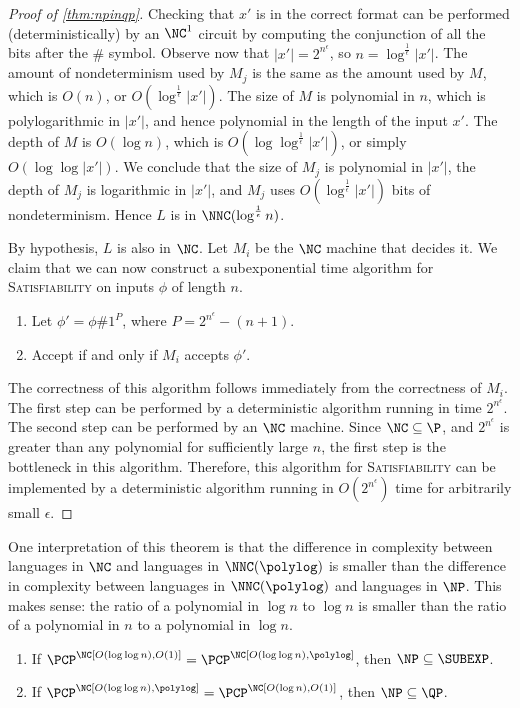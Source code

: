 \documentclass{article}
\newcommand{\loglog}{\log\log}
\begin{document}
\begin{proof}[Proof of \autoref{thm:npinqp}]
  Checking that $x'$ is in the correct format can be performed (deterministically) by an $\NC^1$ circuit by computing the conjunction of all the bits after the $\#$ symbol.
  Observe now that $|x'| = 2^{n^\epsilon}$, so $n = \log^\frac{1}{\epsilon}{|x'|}$.
  The amount of nondeterminism used by $M_j$ is the same as the amount used by $M$, which is $O(n)$, or $O(\log^\frac{1}{\epsilon} |x'|)$.
  The size of $M$ is polynomial in $n$, which is polylogarithmic in $|x'|$, and hence polynomial in the length of the input $x'$.
  The depth of $M$ is $O(\log n)$, which is $O(\log \log^\frac{1}{\epsilon} |x'|)$, or simply $O(\log \log |x'|)$.
  We conclude that the size of $M_j$ is polynomial in $|x'|$, the depth of $M_j$ is logarithmic in $|x'|$, and $M_j$ uses $O(\log^\frac{1}{\epsilon} |x'|)$ bits of nondeterminism.
  Hence $L$ is in $\NNC(\log^\frac{1}{\epsilon} n)$.

  By hypothesis, $L$ is also in $\NC$.
  Let $M_i$ be the $\NC$ machine that decides it.
  We claim that we can now construct a subexponential time algorithm for \textsc{Satisfiability} on inputs $\phi$ of length $n$.
  \begin{enumerate}
  \item Let $\phi' = \phi \# 1^P$, where $P = 2^{n^\epsilon} - (n + 1)$.
  \item Accept if and only if $M_i$ accepts $\phi'$.
  \end{enumerate}
  The correctness of this algorithm follows immediately from the correctness of $M_i$.
  The first step can be performed by a deterministic algorithm running in time $2^{n^\epsilon}$.
  The second step can be performed by an $\NC$ machine.
  Since $\NC \subseteq \P$, and $2^{n^\epsilon}$ is greater than any polynomial for sufficiently large $n$, the first step is the bottleneck in this algorithm.
  Therefore, this algorithm for \textsc{Satisfiability} can be implemented by a deterministic algorithm running in $O(2^{n^\epsilon})$ time for arbitrarily small $\epsilon$.
\end{proof}

One interpretation of this theorem is that the difference in complexity between languages in $\NC$ and languages in $\NNC(\polylog)$ is smaller than the difference in complexity between languages in $\NNC(\polylog)$ and languages in $\NP$.
This makes sense: the ratio of a polynomial in $\log n$ to $\log n$ is smaller than the ratio of a polynomial in $n$ to a polynomial in $\log n$.

\begin{corollary}
  \mbox{}
  \begin{enumerate}
  \item If $\PCP^\NC[O(\loglog n), O(1)] = \PCP^\NC[O(\loglog n), \polylog]$, then $\NP \subseteq \SUBEXP$.
  \item If $\PCP^\NC[O(\loglog n), \polylog] = \PCP^\NC[O(\log n), O(1)]$, then $\NP \subseteq \QP$.
  \end{enumerate}
\end{corollary}
\end{document}
